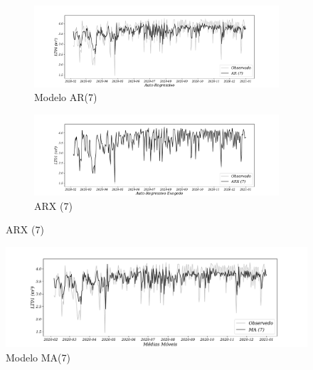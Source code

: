 \begin{figure}[H]
	\centering
	\caption{Comparação dos modelos AR e ARX}
	\begin{subfigure}{1\textwidth}
			\includegraphics[width=\linewidth]{Modelos/Figuras/AR}
			\caption{Modelo AR(7)}
			\label{fig:1-ar}	
		\end{subfigure}
	
	\begin{subfigure}{1\textwidth}
			\includegraphics[width=\linewidth]{Modelos/Figuras/ARX}
			\caption{ARX (7)}
			\label{fig:1-arx}	
		\end{subfigure}
	
\end{figure}




\begin{figure}[H]
	\centering
	\caption{Modelo MA(7) }
	\label{fig:1-ma}
	\includegraphics[width=1\linewidth]{Modelos/Figuras/MA}
	
\end{figure}





